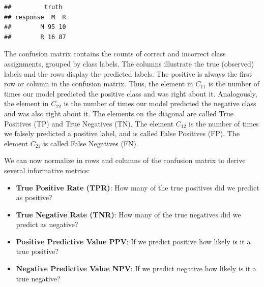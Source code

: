 \documentclass[
]{scrbook}
\newenvironment{Shaded}{\begin{snugshade}}{\end{snugshade}}
\newcommand{\AttributeTok}[1]{\textcolor[rgb]{0.77,0.63,0.00}{#1}}
\newcommand{\FunctionTok}[1]{\textcolor[rgb]{0.00,0.00,0.00}{#1}}
\newcommand{\NormalTok}[1]{#1}
\newcommand{\OtherTok}[1]{\textcolor[rgb]{0.56,0.35,0.01}{#1}}
\newcommand{\SpecialCharTok}[1]{\textcolor[rgb]{0.00,0.00,0.00}{#1}}
\newcommand{\StringTok}[1]{\textcolor[rgb]{0.31,0.60,0.02}{#1}}
\providecommand{\tightlist}{%
  \setlength{\itemsep}{0pt}\setlength{\parskip}{0pt}}
\renewenvironment{Shaded} {\begin{snugshade}\small} {\end{snugshade}}
\begin{document}
\begin{Shaded}
\end{Shaded}

\begin{verbatim}
##         truth
## response  M  R
##        M 95 10
##        R 16 87
\end{verbatim}

The confusion matrix contains the counts of correct and incorrect class assignments, grouped by class labels.
The columns illustrate the true (observed) labels and the rows display the predicted labels.
The positive is always the first row or column in the confusion matrix.
Thus, the element in \(C_{11}\) is the number of times our model predicted the positive class and was right about it.
Analogously, the element in \(C_{22}\) is the number of times our model predicted the negative class and was also right about it.
The elements on the diagonal are called True Positives (TP) and True Negatives (TN).
The element \(C_{12}\) is the number of times we falsely predicted a positive label, and is called False Positives (FP).
The element \(C_{21}\) is called False Negatives (FN).

We can now normalize in rows and columns of the confusion matrix to derive several informative metrics:

\begin{itemize}
\tightlist
\item
  \textbf{True Positive Rate (TPR)}: How many of the true positives did we predict as positive?
\item
  \textbf{True Negative Rate (TNR)}: How many of the true negatives did we predict as negative?
\item
  \textbf{Positive Predictive Value PPV}: If we predict positive how likely is it a true positive?
\item
  \textbf{Negative Predictive Value NPV}: If we predict negative how likely is it a true negative?
\end{itemize}
\end{document}
